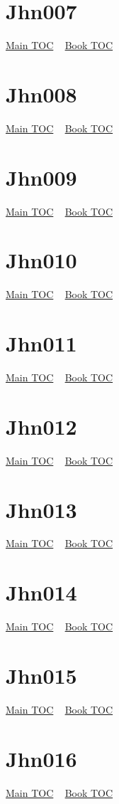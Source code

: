 \documentclass{book}
\begin{document}
  \section{Jhn007}\hyperlink{toc}{Main TOC} ~ \hyperref[subsec:Jhn]{Book TOC} 
  \section{Jhn008}\hyperlink{toc}{Main TOC} ~ \hyperref[subsec:Jhn]{Book TOC} 
  \section{Jhn009}\hyperlink{toc}{Main TOC} ~ \hyperref[subsec:Jhn]{Book TOC} 
  \section{Jhn010}\hyperlink{toc}{Main TOC} ~ \hyperref[subsec:Jhn]{Book TOC} 
  \section{Jhn011}\hyperlink{toc}{Main TOC} ~ \hyperref[subsec:Jhn]{Book TOC} 
  \section{Jhn012}\hyperlink{toc}{Main TOC} ~ \hyperref[subsec:Jhn]{Book TOC} 
  \section{Jhn013}\hyperlink{toc}{Main TOC} ~ \hyperref[subsec:Jhn]{Book TOC} 
  \section{Jhn014}\hyperlink{toc}{Main TOC} ~ \hyperref[subsec:Jhn]{Book TOC} 
  \section{Jhn015}\hyperlink{toc}{Main TOC} ~ \hyperref[subsec:Jhn]{Book TOC} 
  \section{Jhn016}\hyperlink{toc}{Main TOC} ~ \hyperref[subsec:Jhn]{Book TOC} 
\end{document}
